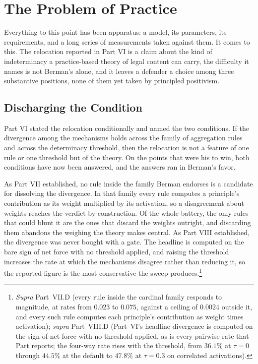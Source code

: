 \section{The Problem of Practice}

Everything to this point has been apparatus: a model, its parameters, its
requirements, and a long series of measurements taken against them. It comes
to this. The relocation reported in Part VI is a claim about the kind of
indeterminacy a practice-based theory of legal content can carry, the
difficulty it names is not Berman's alone, and it leaves a defender a choice
among three substantive positions, none of them yet taken by principled
positivism.

\subsection{Discharging the Condition}

Part VI stated the relocation conditionally and named the two conditions.
If the divergence among the mechanisms holds across the family of
aggregation rules and across the determinacy threshold, then the
relocation is not a feature of one rule or one threshold but of the theory.
On the points that were his to win, both conditions have now been answered,
and the answers ran in Berman's favor.

As Part VII established, no rule inside the family Berman endorses is a
candidate for dissolving the divergence. In that family every rule computes
a principle's contribution as its weight multiplied by its activation, so a
disagreement about weights reaches the verdict by construction. Of the
whole battery, the only rules that could blunt it are the ones that discard
the weights outright, and discarding them abandons the weighing the theory
makes central. As Part VIII established, the divergence was never bought with a gate. The
headline is computed on the bare sign of net force with no threshold applied,
and raising the threshold increases the rate at which the mechanisms disagree
rather than reducing it, so the reported figure is the most conservative the
sweep produces.\footnote{\textit{Supra}
Part~VII.D (every rule inside the cardinal family responds to magnitude,
at rates from $0.023$ to $0.075$, against a ceiling of $0.0024$ outside
it, and every such rule computes each principle's contribution as weight
times activation); \textit{supra} Part~VIII.D (Part~VI's headline divergence is computed on the
sign of net force with no threshold applied, as is every pairwise rate that
Part reports; the four-way rate rises with the threshold, from $36.1\%$ at
$\tau = 0$ through $44.5\%$ at the default to $47.8\%$ at $\tau = 0.3$ on
correlated activations).}

